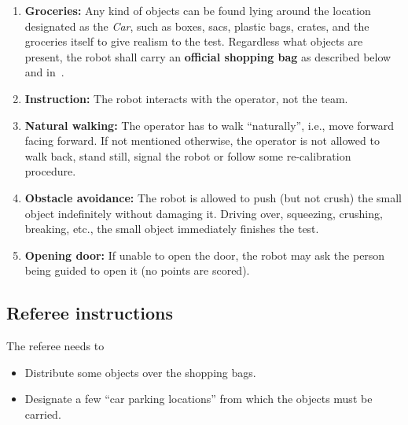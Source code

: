 \begin{enumerate}
  \item \textbf{Groceries:} Any kind of objects can be found lying around the location designated as the \textit{Car}, such as boxes, sacs, plastic bags, crates, and the groceries itself to give realism to the test. Regardless what objects are present, the robot shall carry an \textbf{official shopping bag} as described below and in~.

  \item \textbf{Instruction:} The robot interacts with the operator, not the team.

  \item \textbf{Natural walking:} The operator has to walk \enquote{naturally}, i.e., move forward facing forward. If not mentioned otherwise, the operator is not allowed to walk back, stand still, signal the robot or follow some re-calibration procedure.

  \item \textbf{Obstacle avoidance:} The robot is allowed to push (but not crush) the small object indefinitely without damaging it.
  Driving over, squeezing, crushing, breaking, etc., the small object immediately finishes the test.

  \item \textbf{Opening door:} If unable to open the door, the robot may ask the person being guided to open it (no points are scored).

\end{enumerate}


\subsection{Referee instructions}

The referee needs to
\begin{itemize}
  \item Distribute some objects over the shopping bags.
  \item Designate a few \enquote{car parking locations} from which the objects must be carried.
\end{itemize}

